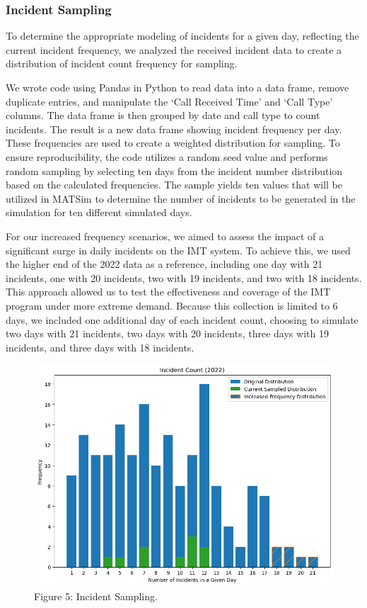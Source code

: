 \documentclass[
  letterpaper,
  authoryear]{elsarticle}
\begin{document}
\hypertarget{incident-sampling}{%
\subsubsection{Incident Sampling}\label{incident-sampling}}

To determine the appropriate modeling of incidents for a given day,
reflecting the current incident frequency, we analyzed the received
incident data to create a distribution of incident count frequency for
sampling.

We wrote code using Pandas in Python to read data into a data frame,
remove duplicate entries, and manipulate the `Call Received Time' and
`Call Type' columns. The data frame is then grouped by date and call
type to count incidents. The result is a new data frame showing incident
frequency per day. These frequencies are used to create a weighted
distribution for sampling. To ensure reproducibility, the code utilizes
a random seed value and performs random sampling by selecting ten days
from the incident number distribution based on the calculated
frequencies. The sample yields ten values that will be utilized in
MATSim to determine the number of incidents to be generated in the
simulation for ten different simulated days.

For our increased frequency scenarios, we aimed to assess the impact of
a significant surge in daily incidents on the IMT system. To achieve
this, we used the higher end of the 2022 data as a reference, including
one day with 21 incidents, one with 20 incidents, two with 19 incidents,
and two with 18 incidents. This approach allowed us to test the
effectiveness and coverage of the IMT program under more extreme demand.
Because this collection is limited to 6 days, we included one additional
day of each incident count, choosing to simulate two days with 21
incidents, two days with 20 incidents, three days with 19 incidents, and
three days with 18 incidents.

\begin{figure}

{\centering \includegraphics{figures/fig5.png}

}

\caption{Figure 5: Incident Sampling.}

\end{figure}
\end{document}
